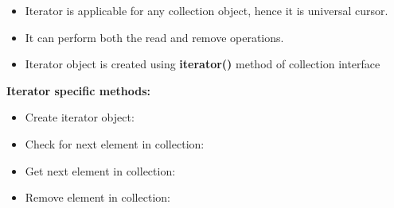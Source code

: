 \setlength{\columnsep}{3pt}
\begin{flushleft}
	
	\begin{itemize}
		\item Iterator is applicable for any collection object, hence it is universal cursor.
		\item It can perform both the read and remove operations.
		\item Iterator object is created using \textbf{iterator()} method of collection interface
	\end{itemize}
	
	\textbf{Iterator specific methods:}
	
	\begin{itemize}
		\item Create iterator object:
		\bigskip
		\item Check for next element in collection: 
		\bigskip
		\item Get next element in collection: 
		\bigskip
		\item Remove element in collection:
	\end{itemize}
	
	

\end{flushleft}
